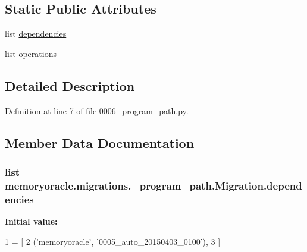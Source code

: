 \subsection*{Static Public Attributes}
\begin{DoxyCompactItemize}
\item 
list \hyperlink{classmemoryoracle_1_1migrations_1_10006__program__path_1_1Migration_a1cf95f9e7a6ec4d82767db6c2f035e10}{dependencies}
\item 
list \hyperlink{classmemoryoracle_1_1migrations_1_10006__program__path_1_1Migration_a38e3e71ea04d783b45424eef8400e71a}{operations}
\end{DoxyCompactItemize}


\subsection{Detailed Description}


Definition at line 7 of file 0006\+\_\+program\+\_\+path.\+py.



\subsection{Member Data Documentation}
\hypertarget{classmemoryoracle_1_1migrations_1_10006__program__path_1_1Migration_a1cf95f9e7a6ec4d82767db6c2f035e10}{}
\subsubsection[{dependencies}]{\setlength{\rightskip}{0pt plus 5cm}list memoryoracle.\+migrations.\+\_\+program\+\_\+path.\+Migration.\+dependencies\hspace{0.3cm}{\ttfamily [static]}}\label{classmemoryoracle_1_1migrations_1_10006__program__path_1_1Migration_a1cf95f9e7a6ec4d82767db6c2f035e10}
{\bfseries Initial value\+:}
\begin{DoxyCode}
1 = [
2         (\textcolor{stringliteral}{'memoryoracle'}, \textcolor{stringliteral}{'0005\_auto\_20150403\_0100'}),
3     ]
\end{DoxyCode}


